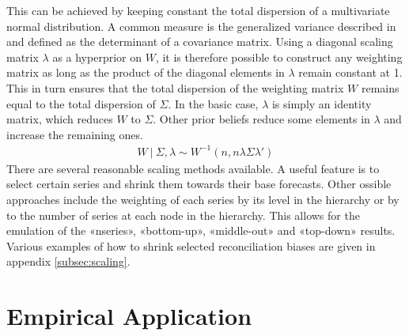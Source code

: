 \documentclass[a4paper,fleqn,11pt]{article}
\begin{document}
This can be achieved by keeping constant the total dispersion of a multivariate normal distribution. A common measure is the generalized variance described in \cite{Mustonen1997} and defined as the determinant of a covariance matrix. Using a diagonal scaling matrix $\lambda$ as a hyperprior on $W$, it is therefore possible to construct any weighting matrix as long as the product of the diagonal elements in $\lambda$ remain constant at 1. This in turn ensures that the total dispersion of the weighting matrix $W$ remains equal to the total dispersion of $\Sigma$. In the basic case, $\lambda$ is simply an identity matrix, which reduces $W$ to $\Sigma$. Other prior beliefs reduce some elements in $\lambda$ and increase the remaining ones. 
\begin{align}
	W\ |\ \Sigma, \lambda  \sim W^{-1}(n, n\lambda\Sigma\lambda')
\end{align}
There are several reasonable scaling methods available. A useful feature is to select certain series and shrink them towards their base forecasts. Other ossible approaches include the weighting of each series by its level in the hierarchy or by to the number of series at each node in the hierarchy. This allows for the emulation of the «nseries», «bottom-up», «middle-out» and «top-down» results. Various examples of how to shrink selected reconciliation biases are given in appendix \ref{subsec:scaling}.

\clearpage


\section{Empirical Application}
\label{sec:appl}
\end{document}
